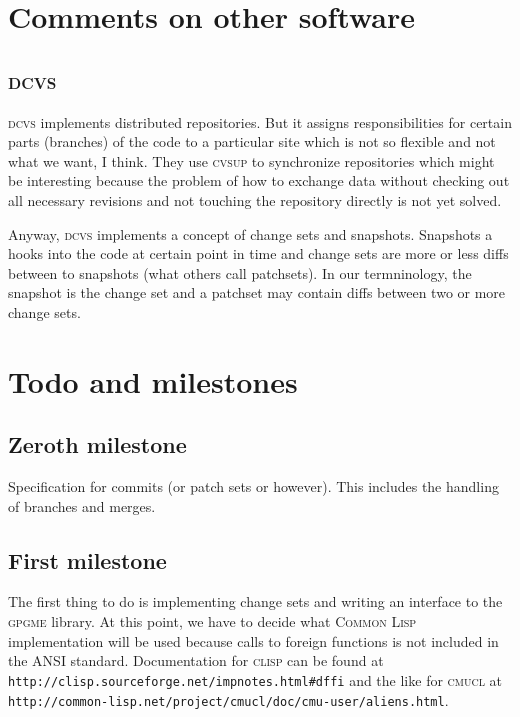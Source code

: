 \documentclass[fleqn, german, 10pt, a4paper]{article}
\begin{document}
\section{Comments on other software}

\subsection{\textsc{dcvs}}

\textsc{dcvs} implements distributed repositories. But it assigns
responsibilities for certain parts (branches) of the code to
a particular site which is not so flexible and not what we want, I think.
They use \textsc{cvsup} to synchronize repositories which might be
interesting because the problem of how to exchange data without checking
out all necessary revisions and not touching the repository directly is
not yet solved.
 
Anyway, \textsc{dcvs} implements a concept of change sets and snapshots.
Snapshots a hooks into the code at certain point in time and change sets
are more or less diffs between to snapshots (what others call patchsets).
In our termninology, the snapshot is the change set and a patchset may
contain diffs between two or more change sets.


\section{Todo and milestones}

\subsection{Zeroth milestone}
Specification for commits (or patch sets or however). This includes
the handling of branches and merges.

\subsection{First milestone}
The first thing to do is implementing change sets and writing an
interface to the \textsc{gpgme} library. At this point, we have to decide
what \textsc{Common Lisp} implementation will be used because calls
to foreign functions is not included in the ANSI standard.
Documentation for \textsc{clisp} can be found at
\texttt{http://clisp.sourceforge.net/impnotes.html\#dffi} and the like
for \textsc{cmucl} at \texttt{http://common-lisp.net/project/cmucl/doc/cmu-user/aliens.html}.
\end{document}
